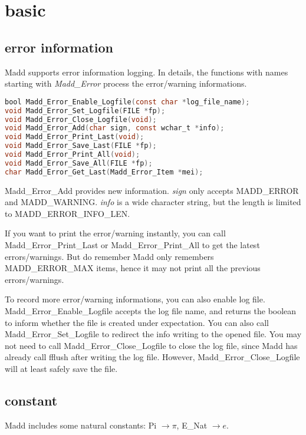\chapter{basic}

\section{error information}

Madd supports error information logging. In details, the functions with names starting with {\it Madd\_Error} process the error/warning informations.

\begin{lstlisting}[language=C, title={Functions of error information.},]
bool Madd_Error_Enable_Logfile(const char *log_file_name);
void Madd_Error_Set_Logfile(FILE *fp);
void Madd_Error_Close_Logfile(void);
void Madd_Error_Add(char sign, const wchar_t *info);
void Madd_Error_Print_Last(void);
void Madd_Error_Save_Last(FILE *fp);
void Madd_Error_Print_All(void);
void Madd_Error_Save_All(FILE *fp);
char Madd_Error_Get_Last(Madd_Error_Item *mei); 
\end{lstlisting} 

Madd\_Error\_Add provides new information. {\it sign} only accepts MADD\_ERROR and MADD\_WARNING. {\it *info} is a wide character string, but the length is limited to MADD\_ERROR\_INFO\_LEN.

If you want to print the error/warning instantly, you can call Madd\_Error\_Print\_Last or Madd\_Error\_Print\_All to get the latest errors/warnings. But do remember Madd only remembers MADD\_ERROR\_MAX items, hence it may not print all the previous errors/warnings. 

To record more error/warning informations, you can also enable log file. Madd\_Error\_Enable\_Logfile accepts the log file name, and returns the boolean to inform whether the file is created under expectation. You can also call Madd\_Error\_Set\_Logfile to redirect the info writing to the opened file. You may not need to call Madd\_Error\_Close\_Logfile to close the log file, since Madd has already call fflush after writing the log file. However, Madd\_Error\_Close\_Logfile will at least safely save the file. 

\section{constant}

Madd includes some natural constants: Pi $\rightarrow \pi$, E\_Nat $\rightarrow e$.

